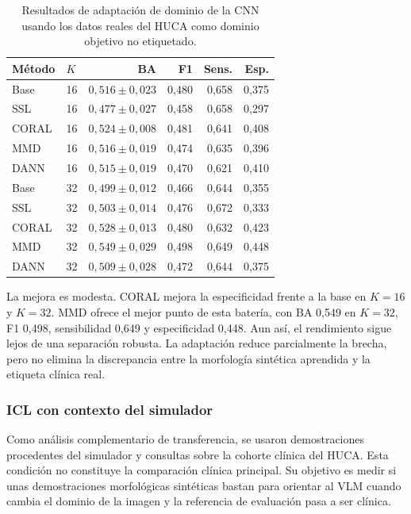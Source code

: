 \begin{table}[H]
  \centering
  \small
  \begin{tabular}{llrrrr}
    \toprule
    Método & \(K\) & BA & F1 & Sens. & Esp. \\
    \midrule
    Base & 16 & \(0,516 \pm 0,023\) & 0,480 & 0,658 & 0,375 \\
    SSL & 16 & \(0,477 \pm 0,027\) & 0,458 & 0,658 & 0,297 \\
    CORAL & 16 & \(0,524 \pm 0,008\) & 0,481 & 0,641 & 0,408 \\
    MMD & 16 & \(0,516 \pm 0,019\) & 0,474 & 0,635 & 0,396 \\
    DANN & 16 & \(0,515 \pm 0,019\) & 0,470 & 0,621 & 0,410 \\
    Base & 32 & \(0,499 \pm 0,012\) & 0,466 & 0,644 & 0,355 \\
    SSL & 32 & \(0,503 \pm 0,014\) & 0,476 & 0,672 & 0,333 \\
    CORAL & 32 & \(0,528 \pm 0,013\) & 0,480 & 0,632 & 0,423 \\
    MMD & 32 & \(0,549 \pm 0,029\) & 0,498 & 0,649 & 0,448 \\
    DANN & 32 & \(0,509 \pm 0,028\) & 0,472 & 0,644 & 0,375 \\
    \bottomrule
  \end{tabular}
  \caption{Resultados de adaptación de dominio de la CNN usando los datos reales del HUCA como dominio objetivo no etiquetado.}
  \label{tab:cnn_domain_real}
\end{table}

La mejora es modesta. CORAL mejora la especificidad frente a la base en \(K=16\) y \(K=32\). MMD ofrece el mejor punto de esta batería, con BA 0,549 en \(K=32\), F1 0,498, sensibilidad 0,649 y especificidad 0,448. Aun así, el rendimiento sigue lejos de una separación robusta. La adaptación reduce parcialmente la brecha, pero no elimina la discrepancia entre la morfología sintética aprendida y la etiqueta clínica real.

\subsubsection{ICL con contexto del simulador}

Como análisis complementario de transferencia, se usaron demostraciones procedentes del simulador y consultas sobre la cohorte clínica del HUCA. Esta condición no constituye la comparación clínica principal. Su objetivo es medir si unas demostraciones morfológicas sintéticas bastan para orientar al VLM cuando cambia el dominio de la imagen y la referencia de evaluación pasa a ser clínica.

